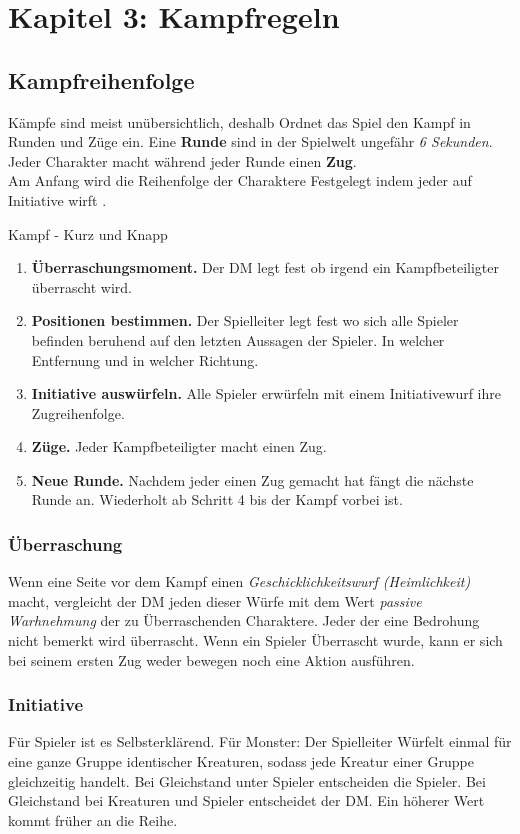 \chapter{Kapitel 3: Kampfregeln}
\section{Kampfreihenfolge}
Kämpfe sind meist unübersichtlich, deshalb Ordnet das Spiel den Kampf in Runden und Züge ein.
Eine \textbf{Runde} sind in der Spielwelt ungefähr \textit{6 Sekunden}. Jeder Charakter macht während jeder Runde einen \textbf{Zug}.\\
Am Anfang wird die Reihenfolge der Charaktere Festgelegt indem jeder auf Initiative wirft .

\begingroup
\setthemecolor[PhbTan]

\begin{paperbox}{Kampf - Kurz und Knapp}
  \begin{enumerate}
    \item \textbf{Überraschungsmoment.} Der DM legt fest ob irgend ein Kampfbeteiligter überrascht wird.
    \item \textbf{Positionen bestimmen.} Der Spielleiter legt fest wo sich alle Spieler befinden beruhend auf den letzten Aussagen der Spieler. In welcher Entfernung und in welcher Richtung.
    \item \textbf{Initiative auswürfeln.} Alle Spieler erwürfeln mit einem Initiativewurf ihre Zugreihenfolge.
    \item \textbf{Züge.} Jeder Kampfbeteiligter macht einen Zug.
    \item \textbf{Neue Runde.} Nachdem jeder einen Zug gemacht hat fängt die nächste Runde an. Wiederholt ab Schritt 4 bis der Kampf vorbei ist.
  \end{enumerate}
\end{paperbox}
\endgroup

\subsection{Überraschung}
Wenn eine Seite vor dem Kampf einen \textit{Geschicklichkeitswurf (Heimlichkeit)} macht, vergleicht der DM jeden dieser Würfe mit dem Wert \textit{passive Warhnehmung} der zu Überraschenden Charaktere. Jeder der eine Bedrohung nicht bemerkt wird überrascht. Wenn ein Spieler Überrascht wurde, kann er sich bei seinem ersten Zug weder bewegen noch eine Aktion ausführen.

\subsection{Initiative}
Für Spieler ist es Selbsterklärend.
Für Monster: Der Spielleiter Würfelt einmal für eine ganze Gruppe identischer Kreaturen, sodass jede Kreatur einer Gruppe gleichzeitig handelt.
Bei Gleichstand unter Spieler entscheiden die Spieler.
Bei Gleichstand bei Kreaturen und Spieler entscheidet der DM. Ein höherer Wert kommt früher an die Reihe.

